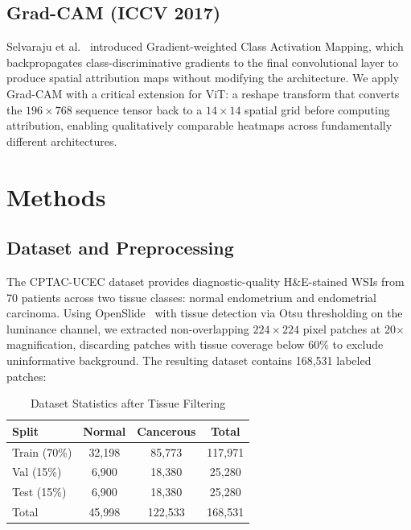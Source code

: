 \documentclass[conference]{IEEEtran}
\begin{document}
\subsection{Grad-CAM (ICCV 2017)}
Selvaraju et al.~\cite{b9} introduced Gradient-weighted Class Activation Mapping, which backpropagates class-discriminative gradients to the final convolutional layer to produce spatial attribution maps without modifying the architecture. We apply Grad-CAM with a critical extension for ViT: a reshape transform that converts the $196\times768$ sequence tensor back to a $14\times14$ spatial grid before computing attribution, enabling qualitatively comparable heatmaps across fundamentally different architectures.

\section{Methods}

\subsection{Dataset and Preprocessing}
The CPTAC-UCEC dataset provides diagnostic-quality H\&E-stained WSIs from 70 patients across two tissue classes: normal endometrium and endometrial carcinoma. Using OpenSlide~\cite{b5} with tissue detection via Otsu thresholding on the luminance channel, we extracted non-overlapping $224\times224$ pixel patches at 20$\times$ magnification, discarding patches with tissue coverage below 60\% to exclude uninformative background. The resulting dataset contains 168,531 labeled patches:

\begin{table}[htbp]
\caption{Dataset Statistics after Tissue Filtering}
\begin{center}
\begin{tabular}{lccc}
\toprule
\textbf{Split} & \textbf{Normal} & \textbf{Cancerous} & \textbf{Total} \\
\midrule
Train (70\%)  & 32,198  & 85,773  & 117,971 \\
Val (15\%)    & 6,900   & 18,380  & 25,280  \\
Test (15\%)   & 6,900   & 18,380  & 25,280  \\
\midrule
Total         & 45,998  & 122,533 & 168,531 \\
\bottomrule
\end{tabular}
\label{tab:dataset}
\end{center}
\end{table}
\end{document}
